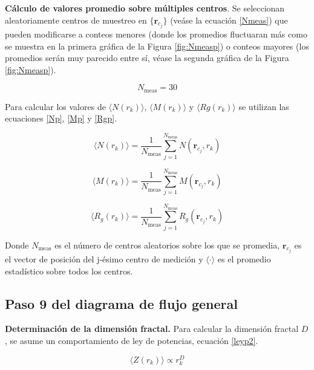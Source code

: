 	\textbf{Cálculo de valores promedio sobre múltiples centros}. Se seleccionan aleatoriamente centros de muestreo en $\{\mathbf{r}_{c_j}\}$ (veáse la ecuación \ref{Nmeas}) que pueden modificarse a conteos menores (donde los promedios fluctuaran más como se muestra en la primera gráfica de la Figura \ref{fig:Nmeasp}) o conteos mayores (los promedios serán muy parecido entre sí, véase la segunda gráfica de la Figura \ref{fig:Nmeasp}). 
	
	
	\begin{equation}
		N_{\text{meas}} = 30  
		\label{Nmeas}
	\end{equation}
	
	Para calcular los valores de $\langle N(r_k) \rangle$, $\langle M(r_k) \rangle$ y $\langle Rg(r_k) \rangle$ se utilizan las ecuaciones \ref{Np}, \ref{Mp} y \ref{Rgp}.
	
	\begin{equation}
		\langle N(r_k) \rangle = \frac{1}{N_{\text{meas}}} 
		\sum_{j=1}^{N_{\text{meas}}} N(\mathbf{r}_{c_j}, r_k)
		\label{Np}
	\end{equation}
	
	\begin{equation}
		\langle M(r_k) \rangle = \frac{1}{N_{\text{meas}}} 
		\sum_{j=1}^{N_{\text{meas}}} M(\mathbf{r}_{c_j}, r_k)
		\label{Mp}
	\end{equation}
	
	\begin{equation}
		\langle R_g(r_k) \rangle = \frac{1}{N_{\text{meas}}} 
		\sum_{j=1}^{N_{\text{meas}}} R_g(\mathbf{r}_{c_j}, r_k)
		\label{Rgp}
	\end{equation}
	
	Donde $	N_{\text{meas}}$ es el número de centros aleatorios sobre los que se promedia,
	$\mathbf{r}_{c_j}$ es el vector de posición del j-ésimo centro de medición y
	$\langle\cdot\rangle$ es el promedio estadístico sobre todos los centros.
		
	
 	
 	\subsection{Paso 9 del diagrama de flujo general}
 		

 	\textbf{Determinación de la dimensión fractal.}	 
 	Para calcular la dimensi\'{o}n fractal $D$, 
 	se asume un comportamiento de ley de potencias, ecuación \ref{leyp2}.
 	
 	\begin{equation}
 		\langle Z(r_{k}) \rangle \propto r^{D}_{k}
 		\label{leyp2}
 	\end{equation}
 	

